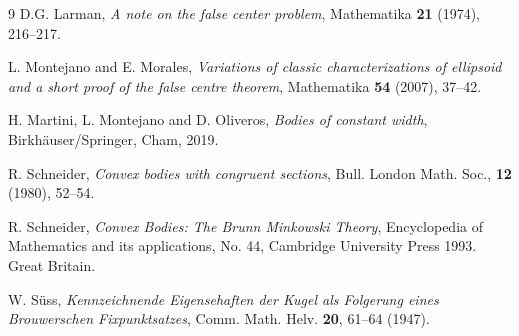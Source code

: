 \documentclass[12pt,thmsa]{amsart}
\begin{document}
\begin{thebibliography}{9}
 D.G. Larman, \textit{ A note on the false center problem}, Mathematika {\bf 21} (1974), 216--217.

 L. Montejano and E. Morales, \textit{ Variations of classic
characterizations of ellipsoid and a short proof of the false centre
theorem}, Mathematika {\bf 54} (2007), 37--42.

 H. Martini, L. Montejano and D. Oliveros, \textit{ Bodies of constant width}, Birkhäuser/Springer, Cham, 2019.

 R. Schneider, \textit{  Convex bodies with congruent sections}, Bull. London Math. Soc., {\bf 12} (1980), 52--54.

 R. Schneider, \textit{ Convex Bodies: The Brunn Minkowski Theory}, Encyclopedia of Mathematics and its applications, No. 44, Cambridge University Press 1993. Great Britain.

 W. S\"uss, \textit{ Kennzeichnende Eigensehaften der Kugel als Folgerung eines Brouwerschen Fixpunktsatzes},  Comm. Math. Helv. {\bf 20}, 61--64 (1947).
\end{thebibliography}


 
\end{document}
